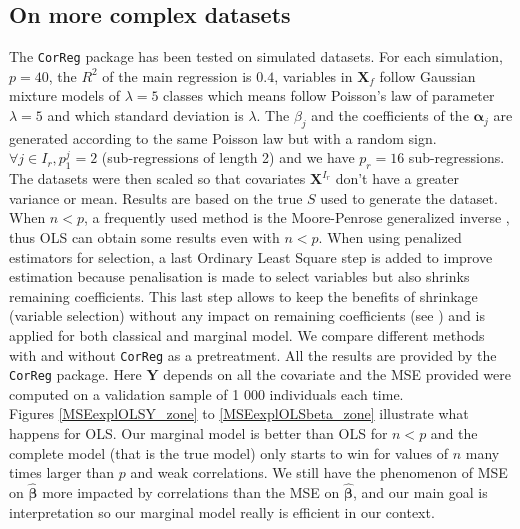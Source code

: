\documentclass[12pt,a4paper]{report}
\begin{document}
 	\FloatBarrier
	\subsection{On more complex datasets}\label{thedatasets}
		The {\tt CorReg} package has been tested on simulated datasets. 
 For each simulation,  $p=40$, the $R^2$ of the main regression is $0.4$, variables in $\boldsymbol{X}_f$ follow Gaussian mixture models of $\lambda=5$ classes which means follow Poisson's law of parameter $\lambda=5$ and which standard deviation is $\lambda$. The $\beta_j$ and the coefficients of the $\boldsymbol{\alpha}_j$ are generated according to the same Poisson law but with a random sign. $\forall j \in I_r, p_1^j=2$ (sub-regressions of length 2) and we have $p_r=16$ sub-regressions. The datasets were then scaled so that covariates $\boldsymbol{X}^{I_r}$ don't have a greater variance or mean.
	Results are based on the true $S$ used to generate the dataset.
	When $n<p$, a frequently used method is the Moore-Penrose generalized inverse \cite{katsikis2008fast}, thus OLS can obtain some results even with $n<p$. %
	When using penalized estimators for selection, a last Ordinary Least Square step is added to improve estimation because penalisation is made to select variables but also shrinks remaining coefficients. This last step allows to keep the benefits of shrinkage (variable selection) without any impact on remaining coefficients (see \cite{SAM10088}) and is applied for both classical and marginal model.
	We compare different methods with and without {\tt CorReg} as a pretreatment. All the results are provided by the {\tt CorReg} package. Here $\boldsymbol{Y}$ depends on all the covariate and the MSE provided were computed on a validation sample of 1 000 individuals each time. \\
	
	Figures \ref{MSEexplOLSY_zone} to \ref{MSEexplOLSbeta_zone} illustrate what happens for OLS. 
Our marginal model is better than OLS for $n<p$ and the complete model (that is the true model) only starts to win for values of $n$ many times larger than $p$ and weak correlations. We still have the phenomenon of MSE on $\hat{\boldsymbol{\beta}}$ more impacted by correlations than the MSE on $\hat{\boldsymbol{\beta}}$, and our main goal is interpretation so our marginal model really is efficient in our context. \\
\end{document}
